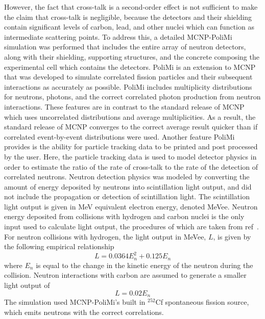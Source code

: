 However, the fact that cross-talk is a second-order effect is not sufficient to make the claim that cross-talk is negligible,
because the detectors and their shielding contain significant levels of carbon, lead, and other nuclei which can function as intermediate scattering points.
To address this, a detailed MCNP-PoliMi~\cite{MCNP_POLIMI} simulation was performed that includes the entire array of neutron detectors, along with their shielding, supporting structures, and the concrete composing the experimental cell which contains the detectors.
PoliMi is an extension to MCNP that was developed to simulate correlated fission particles and their subsequent interactions as accurately as possible.
PoliMi includes multiplicity distributions for neutrons, photons, and the correct correlated photon production from neutron interactions.
These features are in contrast to the standard release of MCNP which uses uncorrelated distributions and average multiplicities.
As a result, the standard release of MCNP converges to the correct average result quicker than if correlated event-by-event distributions were used.
Another feature PoliMi provides is the ability for particle tracking data to be printed and post processed by the user.
Here, the particle tracking data is used to model detector physics in order to estimate the ratio of the rate of cross-talk to the rate of the detection of correlated neutrons.
Neutron detection physics was modeled by converting the amount of energy deposited by neutrons into scintillation light output, and did not include the propagation or detection of scintillation light.
The scintillation light output is given in MeV equivalent electron energy, denoted MeVee.
Neutron energy deposited from collisions with hydrogen and carbon nuclei is the only input used to calculate light output, the procedures of which are taken from ref~\cite{POLIMI}.
For neutron collisions with hydrogen, the light output in MeVee, $L$, is given by the following empirical relationship
\begin{displaymath}
L = 0.0364 E_n^2 +  0.125 E_n
\end{displaymath}
where $E_n$ is equal to the change in the kinetic energy of the neutron during the collision.
Neutron interactions with carbon are assumed to generate a smaller light output of
\begin{displaymath}
L = 0.02 E_n
\end{displaymath}
The simulation used MCNP-PoliMi's built in $^{252}$Cf spontaneous fission source, which emits neutrons with the correct correlations.
